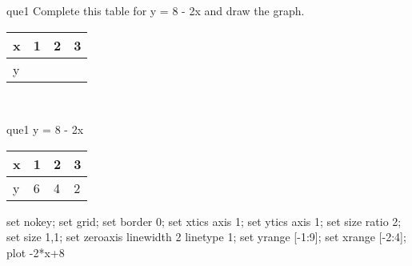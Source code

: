 \documentclass[13.5pt, varwidth=true]{beamer}
\begin{document}
\begin{frame}[shrink=19,fragile]
	\begin{beamercolorbox}[rounded=true, left, shadow=true,wd=14.8cm]{que1}
		 Complete this table for y = 8 - 2x and draw the graph. \\[0.3cm] \renewcommand{\arraystretch}{1.2}\begin{tabular}{|C|C|C|C|} \hline x & 1 & 2 & 3 \\ \hline y & & & \\ \hline \end{tabular}\\[0.3cm]
	\end{beamercolorbox}
\end{frame}
\begin{frame}[shrink=19,fragile]
	\begin{beamercolorbox}[rounded=true, left, shadow=true,wd=14.8cm]{que1}
		y = 8 - 2x\renewcommand{\arraystretch}{1.2}\begin{tabular}{|C|C|C|C|} \hline x & 1 & 2 & 3 \\ \hline y & 6 & 4 & 2\\ \hline \end{tabular}\begin{gnuplot}[terminal=pdf] set nokey; set grid; set border 0; set xtics axis 1; set ytics axis 1; set size ratio 2; set size 1,1; set zeroaxis linewidth 2 linetype 1; set yrange [-1:9]; set xrange [-2:4]; plot -2*x+8 \end{gnuplot}
	\end{beamercolorbox}
\end{frame}
\end{document}
